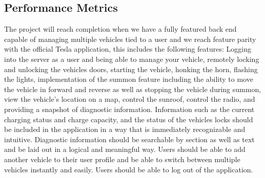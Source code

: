 \documentclass[10pt,letterpaper,draftclsnofoot,onecolumn]{IEEEtran}
\begin{document}
\begin{singlespace}
\section{Performance Metrics}
The project will reach completion when we have a fully featured back end capable of managing multiple vehicles tied to a user and we reach feature parity with the official Tesla application, this includes the following features: Logging into the server as a user and being able to manage your vehicle, remotely locking and unlocking the vehicles doors, starting the vehicle, honking the horn, flashing the lights, implementation of the summon feature including the ability to move the vehicle in forward and reverse as well as stopping the vehicle during summon, view the vehicle’s location on a map, control the sunroof, control the radio, and providing a snapshot of diagnostic information. Information such as the current charging status and charge capacity, and the status of the vehicles locks should be included in the application in a way that is immediately recognizable and intuitive. Diagnostic information should be searchable by section as well as text and be laid out in a logical and meaningful way. Users should be able to add another vehicle to their user profile and be able to switch between multiple vehicles instantly and easily. Users should be able to log out of the application.

\end{singlespace}


\end{document}
